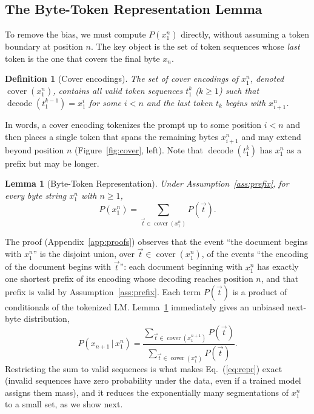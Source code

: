 \documentclass{article} %
\newtheorem{definition}{Definition}
\newtheorem{lemma}{Lemma}
\newcommand{\decf}{\operatorname{decode}}
\newcommand{\coverf}{\operatorname{cover}}
\begin{document}
\subsection{The Byte-Token Representation Lemma}
\label{sec:method_repr}
To remove the bias, we must compute $P(x_1^n)$ directly, without assuming a token boundary at position $n$. The key object is the set of token sequences whose \emph{last} token is the one that covers the final byte $x_n$.

\begin{definition}[Cover encodings]
\label{def:cover}
The set of cover encodings of $x_1^n$, denoted $\coverf(x_1^n)$, contains all valid token sequences $t_1^k$ ($k\geq 1$) such that $\decf(t_1^{k-1}) = x_1^{i}$ for some $i<n$ and the last token $t_k$ begins with $x_{i+1}^{n}$.
\end{definition}

In words, a cover encoding tokenizes the prompt up to some position $i<n$ and then places a single token that spans the remaining bytes $x_{i+1}^n$ and may extend beyond position $n$ (Figure~\ref{fig:cover}, left). Note that $\decf(t_1^k)$ has $x_1^n$ as a prefix but may be longer.

\begin{lemma}[Byte-Token Representation]
\label{lem:repr}
Under Assumption~\ref{ass:prefix}, for every byte string $x_1^n$ with $n\geq 1$,
\begin{equation}
P(x_1^n) = \sum_{\vec{t} \in \coverf(x_1^n)} P(\vec{t}). \label{eq:repr}
\end{equation}
\end{lemma}

The proof (Appendix~\ref{app:proofs}) observes that the event ``the document begins with $x_1^n$'' is the disjoint union, over $\vec{t}\in\coverf(x_1^n)$, of the events ``the encoding of the document begins with $\vec{t}$'': each document beginning with $x_1^n$ has exactly one shortest prefix of its encoding whose decoding reaches position $n$, and that prefix is valid by Assumption~\ref{ass:prefix}. Each term $P(\vec{t})$ is a product of conditionals of the tokenized LM. Lemma~\ref{lem:repr} immediately gives an unbiased next-byte distribution,
\begin{equation}
P(x_{n+1}\,|\,x_1^n) = \frac{\sum_{\vec{t}\in\coverf(x_1^{n+1})} P(\vec{t})}{\sum_{\vec{t}\in\coverf(x_1^{n})} P(\vec{t})}. \label{eq:nextbyte}
\end{equation}
Restricting the sum to valid sequences is what makes Eq.~(\ref{eq:repr}) exact (invalid sequences have zero probability under the data, even if a trained model assigns them mass), and it reduces the exponentially many segmentations of $x_1^n$ to a small set, as we show next.
\end{document}
